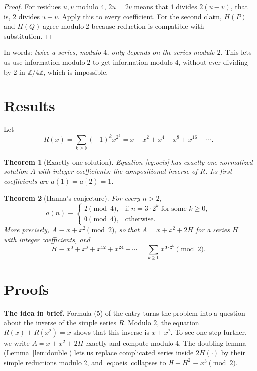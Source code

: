 \documentclass[11pt,a4paper]{article}
\newtheorem{theorem}{Theorem}[section]
\theoremstyle{definition}
\theoremstyle{remark}
\newcommand{\Z}{\mathbb{Z}}
\newcommand{\para}[1]{\par\medskip\noindent\textbf{#1}\enspace}
\begin{document}
\begin{proof}
For residues $u,v$ modulo $4$, $2u=2v$ means that $4$ divides $2(u-v)$, that is, $2$ divides $u-v$. Apply this to
every coefficient. For the second claim, $H(P)$ and $H(Q)$ agree modulo $2$ because reduction is compatible with
substitution.
\end{proof}
In words: \emph{twice a series, modulo $4$, only depends on the series modulo $2$.} This lets us use information modulo
$2$ to get information modulo $4$, without ever dividing by $2$ in $\Z/4\Z$, which is impossible.


\section{Results}\label{sec:results}

Let
\[
R(x)=\sum_{k\ge0}(-1)^kx^{2^k}=x-x^2+x^4-x^8+x^{16}-\cdots .
\]

\begin{theorem}[Exactly one solution]\label{thm:exist}
Equation \eqref{eq:oeis} has exactly one normalized solution $A$ with integer coefficients: the compositional inverse
of $R$. Its first coefficients are $a(1)=a(2)=1$.
\end{theorem}

\begin{theorem}[Hanna's conjecture]\label{thm:main}
For every $n>2$,
\[
a(n)\equiv\begin{cases}2\pmod4,&\text{if }n=3\cdot2^k\text{ for some }k\ge0,\\[2pt]0\pmod4,&\text{otherwise.}\end{cases}
\]
More precisely, $A\equiv x+x^2\pmod 2$, so that $A=x+x^2+2H$ for a series $H$ with integer coefficients, and
\[
H\equiv x^3+x^6+x^{12}+x^{24}+\cdots=\sum_{k\ge0}x^{3\cdot2^k}\pmod 2 .
\]
\end{theorem}

\section{Proofs}\label{sec:proofs}

\para{The idea in brief.} Formula (5) of the entry turns the problem into a question about the inverse of the simple
series $R$. Modulo $2$, the equation $R(x)+R(x^2)=x$ shows that this inverse is $x+x^2$. To see one step further, we
write $A=x+x^2+2H$ exactly and compute modulo $4$. The doubling lemma (Lemma~\ref{lem:double}) lets us replace
complicated series inside $2H(\cdot)$ by their simple reductions modulo $2$, and \eqref{eq:oeis} collapses to
$H+H^2\equiv x^3\pmod 2$.
\end{document}
